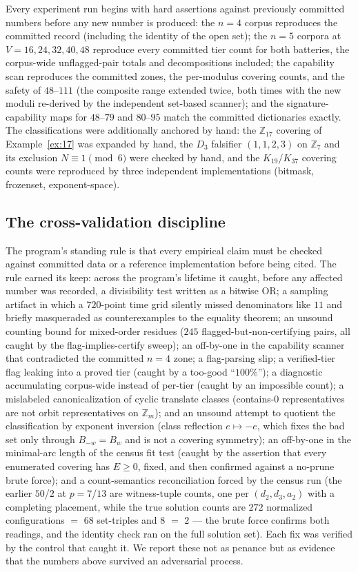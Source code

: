 \documentclass[11pt,a4paper]{article}
\numberwithin{equation}{section}
\theoremstyle{plain}
\theoremstyle{definition}
\theoremstyle{remark}
\newcommand{\Z}{\mathbb{Z}}
\begin{document}
Every experiment run begins with hard assertions against previously
committed numbers before any new number is produced: the $n=4$ corpus
reproduces the committed record (including the identity of the open
set); the $n=5$ corpora at $V=16,24,32,40,48$ reproduce every committed
tier count for both batteries, the corpus-wide unflagged-pair totals and
decompositions included; the capability scan reproduces the committed
zones, the per-modulus covering counts, and the safety of $48$--$111$ (the
composite range extended twice, both times with the new moduli re-derived
by the independent set-based scanner); and the signature-capability maps
for $48$--$79$ and $80$--$95$ match the committed dictionaries exactly. The classifications were additionally anchored by hand: the
$\Z_{17}$ covering of Example~\ref{ex:17} was expanded by hand, the
$D_3$ falsifier $(1,1,2,3)$ on $\Z_7$ and its exclusion
$N\equiv1\pmod6$ were checked by hand, and the $K_{19}$/$K_{37}$
covering counts were reproduced by three independent implementations
(bitmask, frozenset, exponent-space).

\subsection{The cross-validation discipline}

The program's standing rule is that every empirical claim must be checked
against committed data or a reference implementation before being cited.
The rule earned its keep: across the program's lifetime it caught, before
any affected number was recorded, a divisibility test written as a
bitwise OR; a sampling artifact in which a $720$-point time grid silently
missed denominators like $11$ and briefly masqueraded as counterexamples
to the equality theorem; an unsound counting bound for mixed-order
residues ($245$ flagged-but-non-certifying pairs, all caught by the
flag-implies-certify sweep); an off-by-one in the capability scanner that
contradicted the committed $n=4$ zone; a flag-parsing slip; a
verified-tier flag leaking into a proved tier (caught by a too-good
``$100\%$''); a diagnostic accumulating corpus-wide instead of
per-tier (caught by an impossible count); a mislabeled canonicalization
of cyclic translate classes (contains-$0$ representatives are not orbit
representatives on $\Z_m$); and an unsound attempt to quotient the
classification by exponent inversion (class reflection $e\mapsto-e$,
which fixes the bad set only through $B_{-w}=B_w$ and is not a covering
symmetry); an off-by-one in the minimal-arc length of the census fit test (caught by
the assertion that every enumerated covering has $E\ge0$, fixed, and then
confirmed against a no-prune brute force); and a count-semantics
reconciliation forced by the census run (the earlier $50$/$2$ at
$p=7$/$13$ are witness-tuple counts, one per $(d_2,d_3,a_2)$ with a
completing placement, while the true solution counts are $272$
normalized configurations $=$ $68$ set-triples and $8$ $=$ $2$ --- the
brute force confirms both readings, and the identity check ran on the full
solution set).
Each fix was verified by the control that caught it. We report these not
as penance but as evidence that the numbers above survived an adversarial
process.
\end{document}

